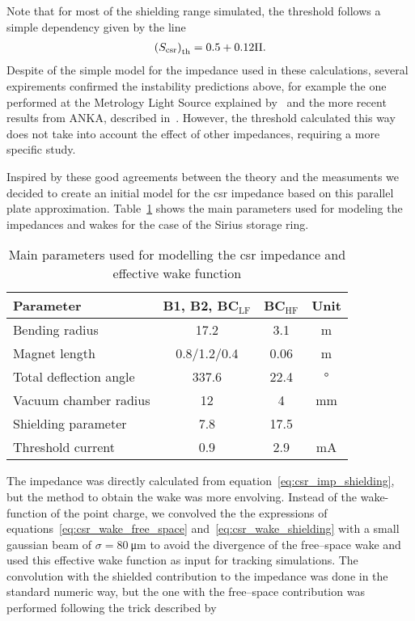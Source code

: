     Note that for most of the shielding range simulated, the threshold follows a simple dependency given by the line
    \begin{align}
        \left(S_\text{csr}\right)_\text{th} = 0.5 + 0.12\Pi.
    \end{align}
    Despite of the simple model for the impedance used in these calculations, several expirements confirmed the instability predictions above, for example the one performed at the Metrology Light Source explained by~ and the more recent results from ANKA, described in~. However, the threshold calculated this way does not take into account the effect of other impedances, requiring a more specific study.

    Inspired by these good agreements between the theory and the measuments we decided to create an initial model for the \gls{csr} impedance based on this parallel plate approximation. Table~\ref{tab:csr_main_parameters} shows the main parameters used for modeling the impedances and wakes for the case of the Sirius storage ring.
    \begin{table}[t]
        \centering
        \caption{Main parameters used for modelling the \gls{csr} impedance and effective wake function}
        \label{tab:csr_main_parameters}
        \begin{tabular}{lccc}
            \toprule
            Parameter              & B1, B2, BC$_\text{LF}$ & BC$_\text{HF}$ & Unit \\
            \midrule
            Bending radius         & 17.2             &  3.1  &\si{\meter}\\
            Magnet length          & 0.8/1.2/0.4      &  0.06 &\si{\meter}\\
            Total deflection angle & 337.6            &  22.4 &\si{\degree}\\
            Vacuum chamber radius  & 12               &  4    &\si{\milli\meter}\\
            Shielding parameter    & 7.8              &  17.5 & \\
            Threshold current      & 0.9              &  2.9  & \si{\milli\ampere}\\
            \bottomrule
        \end{tabular}
    \end{table}
    The impedance was directly calculated from equation~\eqref{eq:csr_imp_shielding}, but the method to obtain the wake was more envolving. Instead of the wake-function of the point charge, we convolved the the expressions of equations~\eqref{eq:csr_wake_free_space} and~\eqref{eq:csr_wake_shielding} with a small gaussian beam of $\sigma = 80~$\si{\micro\meter} to avoid the divergence of the free--space wake and used this effective wake function as input for tracking simulations. The convolution with the shielded contribution to the impedance was done in the standard numeric way, but the one with the free--space contribution was performed following the trick described by~
